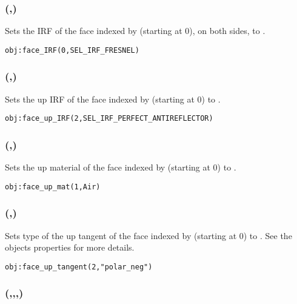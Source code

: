 \subsubsection[face\_IRF]{(,)}

Sets the IRF of the face indexed by  (starting at 0), on both sides, to .
\begin{lstlisting}
obj:face_IRF(0,SEL_IRF_FRESNEL)
\end{lstlisting}

\subsubsection[face\_up\_IRF]{(,)}

Sets the up IRF of the face indexed by  (starting at 0) to .
\begin{lstlisting}
obj:face_up_IRF(2,SEL_IRF_PERFECT_ANTIREFLECTOR)
\end{lstlisting}

\subsubsection[face\_up\_mat]{(,)}

Sets the up material of the face indexed by  (starting at 0) to .
\begin{lstlisting}
obj:face_up_mat(1,Air)
\end{lstlisting}

\subsubsection[face\_up\_tangent (two arguments)]{(,)}

Sets type of the up tangent of the face indexed by  (starting at 0) to . See the objects properties for more details.
\begin{lstlisting}
obj:face_up_tangent(2,"polar_neg")
\end{lstlisting}

\subsubsection[face\_up\_tangent (four arguments)]{(,,,)}

